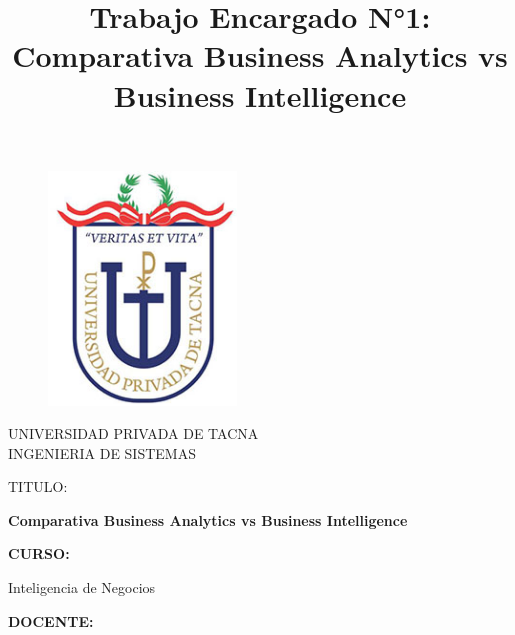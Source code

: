\documentclass[twoside,twocolumn]{article}
\begin{document}
\title{Trabajo Encargado N°1: Comparativa Business Analytics vs Business Intelligence}

\begin{titlepage}
\begin{figure}[htb]
\begin{center}
\includegraphics[width=5cm]{imagenes/logo.png}
\end{center}
\end{figure}
\vspace*{-0.25in}
\begin{center}
\large{UNIVERSIDAD PRIVADA DE TACNA}\\
\vspace*{-0.025in}
INGENIERIA DE SISTEMAS  \\	

\vspace*{0.5in}
\begin{large}
TITULO:\\
\end{large}

\vspace*{0.1in}
\begin{Large}
\textbf{Comparativa Business Analytics vs Business Intelligence} \\
\end{Large}

\vspace*{0.3in}
\begin{Large}
\textbf{CURSO:} \\
\end{Large}

\vspace*{0.1in}
\begin{large}
Inteligencia de Negocios\\
\end{large}

\vspace*{0.3in}
\begin{Large}
\textbf{DOCENTE:} \\
\end{Large}


\end{center}
\end{titlepage}
\end{document}
